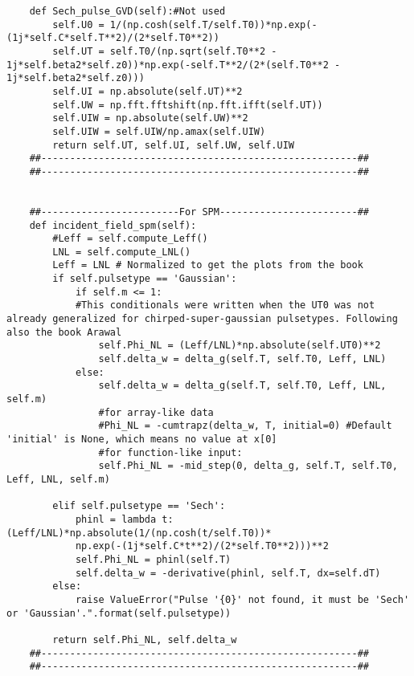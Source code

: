 \begin{verbatim}
    def Sech_pulse_GVD(self):#Not used 
        self.U0 = 1/(np.cosh(self.T/self.T0))*np.exp(-(1j*self.C*self.T**2)/(2*self.T0**2))
        self.UT = self.T0/(np.sqrt(self.T0**2 - 1j*self.beta2*self.z0))*np.exp(-self.T**2/(2*(self.T0**2 - 1j*self.beta2*self.z0)))
        self.UI = np.absolute(self.UT)**2
        self.UW = np.fft.fftshift(np.fft.ifft(self.UT))
        self.UIW = np.absolute(self.UW)**2
        self.UIW = self.UIW/np.amax(self.UIW) 
        return self.UT, self.UI, self.UW, self.UIW
    ##-------------------------------------------------------##
    ##-------------------------------------------------------##


    ##------------------------For SPM------------------------##
    def incident_field_spm(self):
        #Leff = self.compute_Leff()
        LNL = self.compute_LNL()
        Leff = LNL # Normalized to get the plots from the book
        if self.pulsetype == 'Gaussian':
            if self.m <= 1: 
            #This conditionals were written when the UT0 was not already generalized for chirped-super-gaussian pulsetypes. Following also the book Arawal
                self.Phi_NL = (Leff/LNL)*np.absolute(self.UT0)**2
                self.delta_w = delta_g(self.T, self.T0, Leff, LNL)
            else: 
                self.delta_w = delta_g(self.T, self.T0, Leff, LNL, self.m)
                #for array-like data
                #Phi_NL = -cumtrapz(delta_w, T, initial=0) #Default 'initial' is None, which means no value at x[0] 
                #for function-like input:
                self.Phi_NL = -mid_step(0, delta_g, self.T, self.T0, Leff, LNL, self.m)

        elif self.pulsetype == 'Sech':
            phinl = lambda t: (Leff/LNL)*np.absolute(1/(np.cosh(t/self.T0))*
            np.exp(-(1j*self.C*t**2)/(2*self.T0**2)))**2
            self.Phi_NL = phinl(self.T)
            self.delta_w = -derivative(phinl, self.T, dx=self.dT)
        else:
            raise ValueError("Pulse '{0}' not found, it must be 'Sech' or 'Gaussian'.".format(self.pulsetype))

        return self.Phi_NL, self.delta_w
    ##-------------------------------------------------------##
    ##-------------------------------------------------------##


\end{verbatim}
